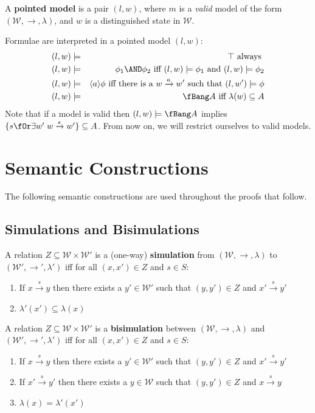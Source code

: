 \begin{definition}
A {\bf pointed model} is a pair $(l,w)$, where $m$ is a \emph{valid} model of the form $(\mathcal{W}, \rightarrow, \lambda)$, and $w$ is a distinguished state in $\mathcal{W}$.
\end{definition}
Formulae are interpreted in a pointed model $(l,w)$:
\begin{eqnarray}
(l,w) & \models & \top  \mbox{ always } \nonumber \\
(l,w) & \models & \phi_1 \AND \phi_2 \mbox{ iff } (l,w)  \models \phi_1 \mbox { and } (l,w) \models \phi_2 \nonumber \\
(l,w) & \models & \langle a \rangle \phi \mbox{ iff there is a } w \xrightarrow{a} w' \mbox { such that } (l,w') \models \phi \nonumber \\
(l,w) & \models & \fBang A \mbox{ iff } \lambda(w) \subseteq A\nonumber
\end{eqnarray}
Note that if a model is valid then $(l,w) \models \fBang A$ implies $\{s \fOr \exists w' \; w \xrightarrow{s} w'\} \subseteq A$.
From now on, we will restrict ourselves to valid models.



\section{Semantic Constructions}
The following semantic constructions are used throughout the proofs that follow.
\subsection{Simulations and Bisimulations}

A relation $Z \subseteq \mathcal{W} \times \mathcal{W}'$ is a (one-way) {\bf simulation} from  $(\mathcal{W}, \rightarrow, \lambda)$ to $(\mathcal{W}', \rightarrow', \lambda')$ iff for all $(x,x') \in Z$ and $s \in S$:
\begin{enumerate}
\item
If $x \xrightarrow{s} y$ then there exists a $y' \in \mathcal{W}'$ such that $(y,y') \in Z$ and $x' \xrightarrow{s} y'$
\item
$\lambda'(x') \subseteq \lambda(x)$
\end{enumerate}
A relation $Z \subseteq \mathcal{W} \times \mathcal{W}'$ is a {\bf bisimulation} between  $(\mathcal{W}, \rightarrow, \lambda)$ and $(\mathcal{W}', \rightarrow', \lambda')$ iff for all $(x,x') \in Z$ and $s \in S$:
\begin{enumerate}
\item
If $x \xrightarrow{s} y$ then there exists a $y' \in \mathcal{W}'$ such that $(y,y') \in Z$ and $x' \xrightarrow{s} y'$
\item
If $x' \xrightarrow{s} y'$ then there exists a $y \in \mathcal{W}$ such that $(y,y') \in Z$ and $x \xrightarrow{s} y$
\item
$\lambda(x) = \lambda'(x')$
\end{enumerate}

